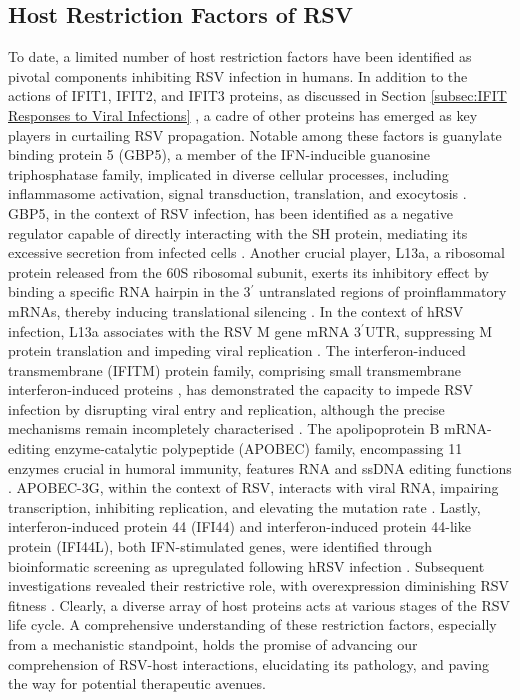 \subsection{Host Restriction Factors of RSV} \label{subsec:Host Restriction Factors of RSV}
To date, a limited number of host restriction factors have been identified as pivotal components inhibiting RSV infection in humans. In addition to the actions of IFIT1, IFIT2, and IFIT3 proteins, as discussed in Section \ref{subsec:IFIT Responses to Viral Infections} \cite{Drori2020InfluenzaProteins}, a cadre of other proteins has emerged as key players in curtailing RSV propagation. Notable among these factors is guanylate binding protein 5 (GBP5), a member of the IFN-inducible guanosine triphosphatase family, implicated in diverse cellular processes, including inflammasome activation, signal transduction, translation, and exocytosis \cite{Feng2017InducibleInfection}. GBP5, in the context of RSV infection, has been identified as a negative regulator capable of directly interacting with the SH protein, mediating its excessive secretion from infected cells \cite{Li2020GBP5Virus}. Another crucial player, L13a, a ribosomal protein released from the 60S ribosomal subunit, exerts its inhibitory effect by binding a specific RNA hairpin in the 3$^{\prime}$ untranslated regions of proinflammatory mRNAs, thereby inducing translational silencing \cite{Sampath2004NoncanonicalSynthetase, Vyas2009Genome-WideMonocytes}. In the context of hRSV infection, L13a associates with the RSV M gene mRNA 3$^{\prime}$UTR, suppressing M protein translation and impeding viral replication \cite{Mazumder2014ExtraribosomalDefense}. The interferon-induced transmembrane (IFITM) protein family, comprising small transmembrane interferon-induced proteins \cite{Diamond2013TheProteins}, has demonstrated the capacity to impede RSV infection by disrupting viral entry and replication, although the precise mechanisms remain incompletely characterised \cite{Smith2019Interferon-InducedMembrane}. The apolipoprotein B mRNA-editing enzyme-catalytic polypeptide (APOBEC) family, encompassing 11 enzymes crucial in humoral immunity, features RNA and ssDNA editing functions \cite{Chelico2009StochasticAPOBEC3G}. APOBEC-3G, within the context of RSV, interacts with viral RNA, impairing transcription, inhibiting replication, and elevating the mutation rate \cite{Fehrholz2012TheViruses}. Lastly, interferon-induced protein 44 (IFI44) and interferon-induced protein 44-like protein (IFI44L), both IFN-stimulated genes, were identified through bioinformatic screening as upregulated following hRSV infection \cite{McDonald2016ADisease, Li2021IdentificationVirus}. Subsequent investigations revealed their restrictive role, with overexpression diminishing RSV fitness \cite{Busse2020Interferon-InducedVirus}. Clearly, a diverse array of host proteins acts at various stages of the RSV life cycle. A comprehensive understanding of these restriction factors, especially from a mechanistic standpoint, holds the promise of advancing our comprehension of RSV-host interactions, elucidating its pathology, and paving the way for potential therapeutic avenues.

